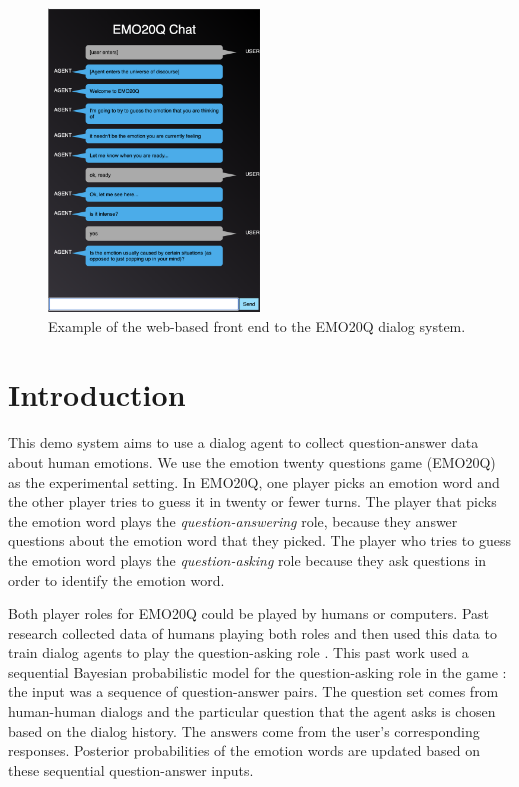 \documentclass[conference]{IEEEtran}
\begin{document}
\begin{figure}[h]
\centering
\includegraphics[width=0.5\textwidth]{emo20q-flask-websocket}
\caption{Example of the web-based front end to the EMO20Q dialog
  system.}
\label{fig:emo20q-flask-websocket}
\end{figure}


\section{Introduction}

This demo system aims to use a dialog agent to collect question-answer
data about human emotions.  We use the emotion twenty questions game
(EMO20Q) as the experimental setting.  In EMO20Q, one player picks an
emotion word and the other player tries to guess it in twenty or fewer
turns. The player that picks the emotion word plays the {\it
  question-answering} role, because they answer questions about the
emotion word that they picked.  The player who tries to guess the
emotion word plays the {\it question-asking} role because they ask
questions in order to identify the emotion word.

Both player roles for EMO20Q could be played by humans or computers.
Past research collected data of humans playing both roles and then
used this data to train dialog agents to play the question-asking role
\cite{Kazemzadeh2012}.  This past work used a sequential Bayesian
probabilistic model for the question-asking role in the game
\cite{Kazemzadeh2012}: the input was a sequence of question-answer
pairs. The question set comes from human-human dialogs and the
particular question that the agent asks is chosen based on the dialog
history. The answers come from the user's corresponding responses.
Posterior probabilities of the emotion words are updated based on
these sequential question-answer inputs.
\end{document}
